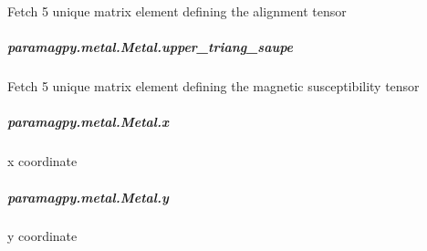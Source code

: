 \documentclass[a4paper,10pt,english,openany,oneside]{sphinxmanual}
\begin{document}
\begin{fulllineitems}
\begin{fulllineitems}
\begin{fulllineitems}
\label{\detokenize{reference/generated/paramagpy.metal.Metal.upper_triang_alignment:paramagpy.metal.Metal.upper_triang_alignment}}
Fetch 5 unique matrix element defining the alignment tensor

\end{fulllineitems}



\subparagraph{paramagpy.metal.Metal.upper\_triang\_saupe}
\label{\detokenize{reference/generated/paramagpy.metal.Metal.upper_triang_saupe:paramagpy-metal-metal-upper-triang-saupe}}\label{\detokenize{reference/generated/paramagpy.metal.Metal.upper_triang_saupe::doc}}

\begin{fulllineitems}
\label{\detokenize{reference/generated/paramagpy.metal.Metal.upper_triang_saupe:paramagpy.metal.Metal.upper_triang_saupe}}
Fetch 5 unique matrix element defining the magnetic
susceptibility tensor

\end{fulllineitems}



\subparagraph{paramagpy.metal.Metal.x}
\label{\detokenize{reference/generated/paramagpy.metal.Metal.x:paramagpy-metal-metal-x}}\label{\detokenize{reference/generated/paramagpy.metal.Metal.x::doc}}

\begin{fulllineitems}
\label{\detokenize{reference/generated/paramagpy.metal.Metal.x:paramagpy.metal.Metal.x}}
x coordinate

\end{fulllineitems}



\subparagraph{paramagpy.metal.Metal.y}
\label{\detokenize{reference/generated/paramagpy.metal.Metal.y:paramagpy-metal-metal-y}}\label{\detokenize{reference/generated/paramagpy.metal.Metal.y::doc}}

\begin{fulllineitems}
\label{\detokenize{reference/generated/paramagpy.metal.Metal.y:paramagpy.metal.Metal.y}}
y coordinate


\end{fulllineitems}
\end{fulllineitems}
\end{fulllineitems}
\end{document}
